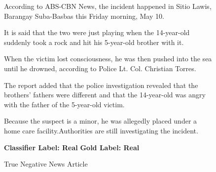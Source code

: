 \begin{figure}[h!]
{{                          \small \raggedright According to ABS-CBN News, the incident happened in Sitio Lawis, Barangay Suba-Basbas this Friday morning, May 10.\linebreak

                          \small \raggedright It is said that the two were just playing when the 14-year-old suddenly took a rock and hit his 5-year-old brother with it.\linebreak

                          \small \raggedright When the victim lost consciousness, he was then pushed into the sea until he drowned, according to Police Lt. Col. Christian Torres.\linebreak

                          \small \raggedright The report added that the police investigation revealed that the brothers' fathers were different and that the 14-year-old was angry with the father of the 5-year-old victim.\linebreak

                          \small \raggedright Because the suspect is a minor, he was allegedly placed under a home care facility.Authorities are still investigating the incident.\linebreak
                            \linebreak

                            \textbf{Classifier Label: Real} \newline
                            \textbf{Gold Label: Real}

                        }
                      }
                         \caption{True Negative News Article}
                            \label{fig:true-negative-news-article}
                        \end{figure}
\clearpage
\pagebreak


